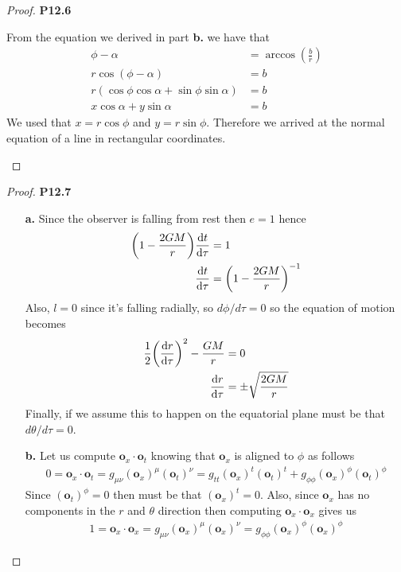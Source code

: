 \documentclass[11pt]{article}
\theoremstyle{definition}
\begin{document}
\begin{proof}{\textbf{P12.6}}
\begin{itemize}
    From the equation we derived in part \textbf{b.} we have that
    \begin{align*}
        \phi - \alpha &= \arccos(\frac{b}{r})\\
        r\cos(\phi - \alpha) &= b\\
        r(\cos\phi\cos\alpha + \sin\phi\sin\alpha) &= b\\
        x\cos\alpha + y\sin\alpha &= b
    \end{align*}
    We used that $x = r\cos\phi$ and $y = r\sin\phi$. 
    Therefore we arrived at the normal equation of a line in rectangular
    coordinates.
\end{itemize}
\end{proof}
\cleardoublepage
\begin{proof}{\textbf{P12.7}}
\begin{itemize}
    \item [\textbf{a.}] Since the observer is falling from rest then $e = 1$
    hence
    \begin{align*}
        \bigg(1 - \frac{2GM}{r}\bigg)\dv{t}{\tau} &= 1\\
        \dv{t}{\tau} &= \bigg(1 - \frac{2GM}{r}\bigg)^{-1}
    \end{align*}
    Also, $l = 0$ since it's falling radially, so $d\phi/d\tau = 0$ so the
    equation of motion becomes
    \begin{align*}
        \frac{1}{2}\bigg(\dv{r}{\tau}\bigg)^{2} - \frac{GM}{r} &= 0\\
        \dv{r}{\tau} &= \pm\sqrt{\frac{2GM}{r}}
    \end{align*}
    Finally, if we assume this to happen on the equatorial plane must be that
    $d\theta/d\tau = 0$.
    \item [\textbf{b.}] Let us compute $\bm{o}_x \cdot \bm{o}_t$ knowing that
    $\bm{o}_x$ is aligned to $\phi$ as follows
    \begin{align*}
        0 = \bm{o}_x \cdot \bm{o}_t
        = g_{\mu\nu} (\bm{o}_x)^\mu(\bm{o}_t)^\nu
        = g_{tt} (\bm{o}_x)^t(\bm{o}_t)^t
        + g_{\phi\phi} (\bm{o}_x)^\phi(\bm{o}_t)^\phi
    \end{align*}
    Since $(\bm{o}_t)^\phi = 0$ then must be that $(\bm{o}_x)^t = 0$.
    Also, since $\bm{o}_x$ has no components in the $r$ and $\theta$ direction
    then computing $\bm{o}_x \cdot \bm{o}_x$ gives us
    \begin{align*}
        1 = \bm{o}_x \cdot \bm{o}_x
        = g_{\mu\nu} (\bm{o}_x)^\mu(\bm{o}_x)^\nu
        = g_{\phi\phi} (\bm{o}_x)^\phi(\bm{o}_x)^\phi

\end{align*}
\end{itemize}
\end{proof}
\end{document}
